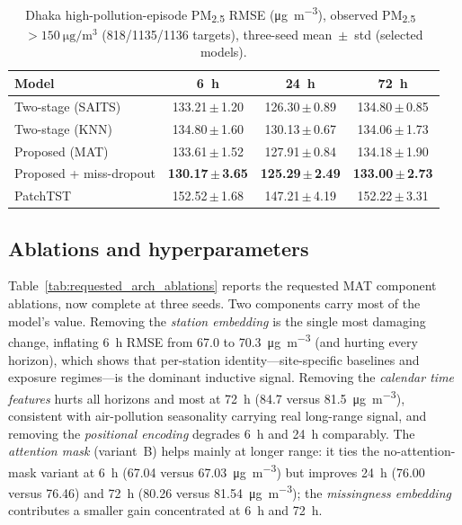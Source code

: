 \documentclass[review,3p,times]{elsarticle}
\newcommand{\ugm}{\si{\micro\gram\per\cubic\metre}}
\newcommand{\pmf}{PM\textsubscript{2.5}}
\begin{document}
\begin{table}[t]
\centering
\caption{Dhaka high-pollution-episode \pmf{} RMSE (\ugm), observed
\pmf{}~$>\SI{150}{\ugm}$ (818/1135/1136 targets), three-seed mean~$\pm$~std
(selected models).}
\label{tab:episode}
\small
\begin{tabular}{lccc}
\toprule
Model & \SI{6}{\hour} & \SI{24}{\hour} & \SI{72}{\hour} \\
\midrule
Two-stage (SAITS)       & 133.21\,$\pm$\,1.20 & 126.30\,$\pm$\,0.89 & 134.80\,$\pm$\,0.85 \\
Two-stage (KNN)         & 134.80\,$\pm$\,1.60 & 130.13\,$\pm$\,0.67 & 134.06\,$\pm$\,1.73 \\
Proposed (MAT)          & 133.61\,$\pm$\,1.52 & 127.91\,$\pm$\,0.84 & 134.18\,$\pm$\,1.90 \\
Proposed + miss-dropout & \textbf{130.17\,$\pm$\,3.65} & \textbf{125.29\,$\pm$\,2.49} & \textbf{133.00\,$\pm$\,2.73} \\
PatchTST                & 152.52\,$\pm$\,1.68 & 147.21\,$\pm$\,4.19 & 152.22\,$\pm$\,3.31 \\
\bottomrule
\end{tabular}
\end{table}

\subsection{Ablations and hyperparameters}
\label{sec:ablations}

Table~\ref{tab:requested_arch_ablations} reports the requested MAT component
ablations, now complete at three seeds. Two components carry most of the model's
value. Removing the \emph{station embedding} is the single most damaging change,
inflating \SI{6}{\hour} RMSE from \SI{67.0}{} to \SI{70.3}{\ugm} (and hurting
every horizon), which shows that per-station identity---site-specific baselines
and exposure regimes---is the dominant inductive signal. Removing the
\emph{calendar time features} hurts all horizons and most at \SI{72}{\hour}
(\SI{84.7}{} versus \SI{81.5}{\ugm}), consistent with air-pollution seasonality
carrying real long-range signal, and removing the \emph{positional encoding}
degrades \SI{6}{\hour} and \SI{24}{\hour} comparably. The \emph{attention mask}
(variant~B) helps mainly at longer range: it ties the no-attention-mask variant
at \SI{6}{\hour} (\SI{67.04}{} versus \SI{67.03}{\ugm}) but improves
\SI{24}{\hour} (\SI{76.00}{} versus \SI{76.46}{}) and \SI{72}{\hour}
(\SI{80.26}{} versus \SI{81.54}{\ugm}); the \emph{missingness embedding}
contributes a smaller gain concentrated at \SI{6}{\hour} and \SI{72}{\hour}.
\end{document}

